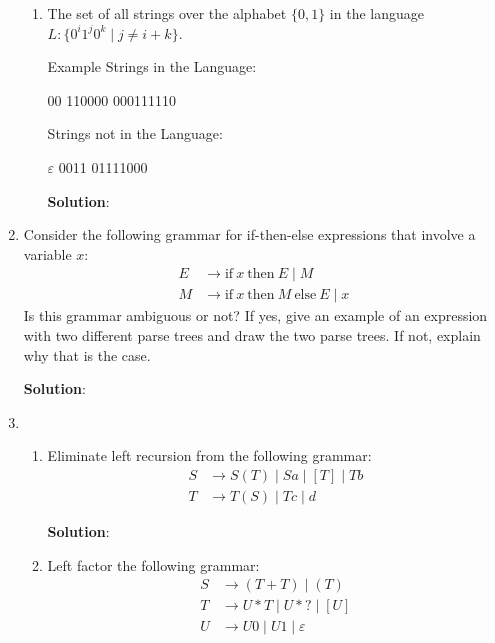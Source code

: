 \documentclass[11pt]{article}
\newcommand\tab[1][1cm]{\hspace*{#1}}
\let\epsilon\varepsilon
\begin{document}
\begin{enumerate}
\begin{enumerate}
  \item  The set of all strings over the alphabet $\{0,1\}$ in the language $L:\{0^i 1^j 0^k \mid j \neq i+k\}$.

    Example Strings in the Language: 
    \begin{center}
      00 \tab \tab 110000  \tab \tab 000111110
    \end{center}
    Strings not in the Language: 
    \begin{center}
      $\epsilon$ \tab \tab 0011 \tab\tab 01111000
    \end{center}

    \textbf{Solution}:
  \end{enumerate}

  \newpage

\item Consider the following grammar for if-then-else expressions that involve a variable $x$:
  \begin{align*}
    E &\to \text{if} \ x \ \text{then} \ E \mid \mathit{M} \\
    \mathit{M} &\to \text{if} \ x \ \text{then} \ \mathit{M} \ \text{else} \ E \mid x
  \end{align*}
  Is this grammar ambiguous or not?
  If yes, give an example of an expression with two different parse trees and draw the two parse trees.
  If not, explain why that is the case.

  \textbf{Solution}:

  \newpage

\item
  \begin{enumerate}
  \item Eliminate left recursion from the following grammar:
    \begin{equation*}
      \begin{split}
        S &\to S(T) \mid Sa \mid [ T ] \mid Tb \\
        T &\to T(S) \mid Tc \mid d
      \end{split}
    \end{equation*}

    \textbf{Solution}:
    
  \item Left factor the following grammar:
    \begin{equation*}
      \begin{split}
        S &\to (T+T) \mid (T) \\
        T &\to U*T \mid U*? \mid [ U ] \\
        U &\to U0 \mid U1 \mid \epsilon 
      \end{split}
    \end{equation*}
    

\end{enumerate}
\end{enumerate}
\end{document}
